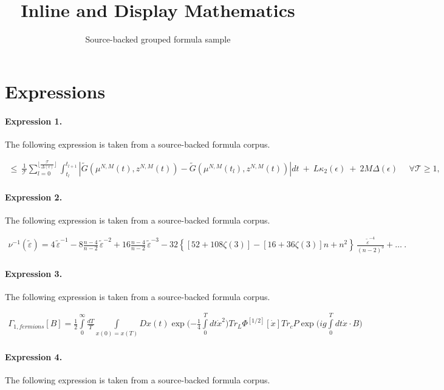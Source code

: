 \documentclass[11pt]{article}
\title{Inline and Display Mathematics}
\author{Source-backed grouped formula sample}
\date{}
\begin{document}
\maketitle
\section{Expressions}
\paragraph{Expression 1.} The following expression is taken from a source-backed formula corpus.

\begin{align*}\leq \ \frac{1}{\mathcal{T}}\sum_{l=0}^{\lfloor \frac{\mathcal{T}}{\Delta(\epsilon)} \rfloor}\int_{t_l}^{t_{l+1}}|\tilde G(\mu^{N,M}(t),z^{N,M}(t)) - \tilde G( \mu^{N,M}(t_l), z^{N,M}(t))|dt \ + \ L \kappa_2(\epsilon) \ + \ 2M\Delta(\epsilon) \ \ \ \ \ \ \forall \mathcal{T} \geq 1,\end{align*}

\paragraph{Expression 2.} The following expression is taken from a source-backed formula corpus.

\begin{align*}\nu ^{-1}(\tilde \varepsilon )= {4}\,{\tilde \varepsilon^{-1} }-8 \frac{n-4}{n-2}\,\tilde \varepsilon^{-2}+16 \frac{n-4}{n-2}\,\tilde \varepsilon^{-3 }-32 \left\{\left[52+108\zeta(3)\right]-\left[16+36\zeta(3)\right]n+n^2 \right\} \,\frac{\tilde \varepsilon^{-4 }}{(n-2)^3}+\dots~.\end{align*}

\paragraph{Expression 3.} The following expression is taken from a source-backed formula corpus.

\begin{align*}\Gamma _{1,fermions} \left[ B \right] = \frac{1}{2}\int\limits_0^\infty {\frac{{dT}}{T}} \int\limits_{x(0) = x(T)} {Dx(t)\exp ( - \frac{1}{4}} \int\limits_0^T {dt\dot x^2 } )Tr_L \Phi ^{\left[ {1/2} \right]} \left[ {\dot x} \right]Tr_c P\exp (ig\int\limits_0^T {dt\dot x \cdot B)}\end{align*}

\paragraph{Expression 4.} The following expression is taken from a source-backed formula corpus.
\end{document}
